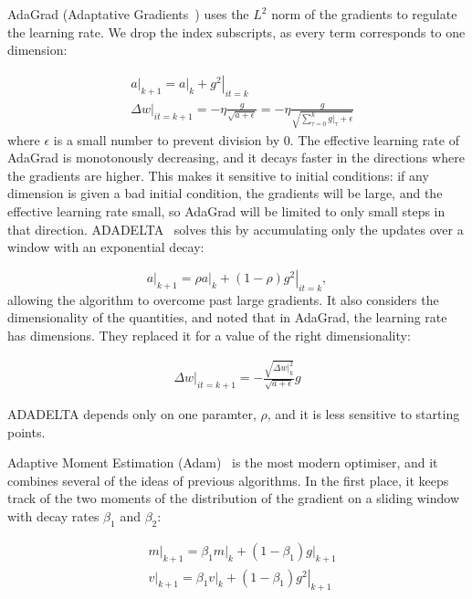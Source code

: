 AdaGrad (Adaptative Gradients~\citep{adagrad}) uses the $L^2$ norm of the gradients to regulate the learning rate.
We drop the index subscripts, as every term corresponds to one dimension:

\begin{align*}
&\left.a\right|_{k+1} = \left. a\right|_{k} + \left.g^2\right|_{it=k}\\
&\left.\Delta w\right|_{it=k+1} = - \eta\frac{g}{\sqrt{a + \epsilon}} =  - \eta\frac{g}{\sqrt{\sum_{\tau=0}^{k} \left.g\right|_\tau + \epsilon}}
\end{align*}
where $\epsilon$ is a small number to prevent division by 0.
The effective learning rate of AdaGrad is monotonously decreasing, and it decays faster in the directions where the gradients are higher.
This makes it sensitive to initial conditions: if any dimension is given a bad initial condition, the gradients will be large, and the effective learning rate small, so AdaGrad will be limited to only small steps in that direction.
ADADELTA~\citep{adadelta} solves this by accumulating only the updates over a window with an exponential decay:

\begin{equation*}
\left.a\right|_{k+1} = \rho \left. a\right|_{k} + (1-\rho) \left.g^2\right|_{it=k},
\end{equation*}
allowing the algorithm to overcome past large gradients.
It also considers the dimensionality of the quantities, and noted that in AdaGrad, the learning rate has dimensions.
They replaced it for a value of the right dimensionality:

\begin{align*}
\left.\Delta w\right|_{it=k+1} = - \frac{\sqrt{\left.\Delta w\right|_{k}^2}}{\sqrt{a + \epsilon}}g 
\end{align*}

ADADELTA depends only on one paramter, $\rho$, and it is less sensitive to starting points.

Adaptive Moment Estimation (Adam)~\citep{adam}
is the most modern optimiser, and it combines several of the ideas of previous algorithms.
In the first place, it keeps track of the two moments of the distribution of the gradient on a sliding window with decay rates $\beta_1$ and $\beta_2$:

\begin{align*}
&\left.m\right|_{k+1} = \beta_1 \left.m\right|_k + (1-\beta_1) \left.g\right|_{k+1}\\
&\left.v\right|_{k+1} = \beta_1 \left.v\right|_k + (1-\beta_1) \left.g^2\right|_{k+1}
\end{align*}

